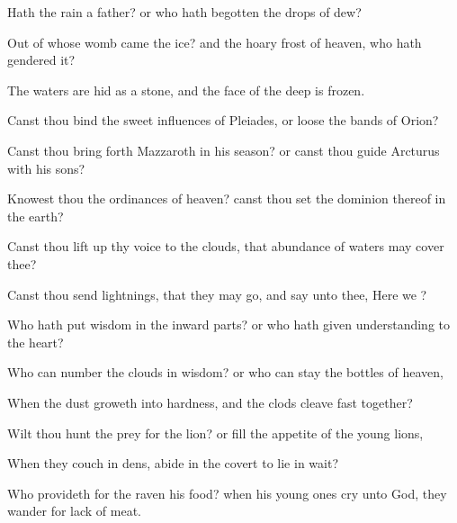 {Hath the
rain a
father? or who hath
begotten the
drops of
dew?

Out of whose
womb
came the
ice? and the hoary
frost of
heaven, who hath
gendered it?

The
waters are
hid as
{} a
stone, and the
face of the
deep is
frozen.

Canst thou
bind the sweet
influences of
Pleiades, or
loose the
bands of
Orion?

Canst thou bring
forth
Mazzaroth in his
season? or canst thou
guide
Arcturus with his
sons?

Knowest thou the
ordinances of
heaven? canst thou
set the
dominion thereof in the
earth?

Canst thou lift
up thy
voice to the
clouds, that
abundance of
waters may
cover thee?

Canst thou
send
lightnings, that they may
go, and
say unto thee, Here we
{}?

Who hath
put
wisdom in the inward
parts? or who hath
given
understanding to the
heart?

Who can
number the
clouds in
wisdom? or who can
stay the
bottles of
heaven,

When the
dust
groweth into
hardness, and the
clods cleave fast
together?

Wilt thou
hunt the
prey for the
lion? or
fill the
appetite of the young
lions,

When they
couch in
{}
dens,
{}
abide in the
covert
to lie in
wait?

Who
provideth for the
raven his
food? when his young
ones
cry unto
God, they
wander for
lack of
meat.




\par }
